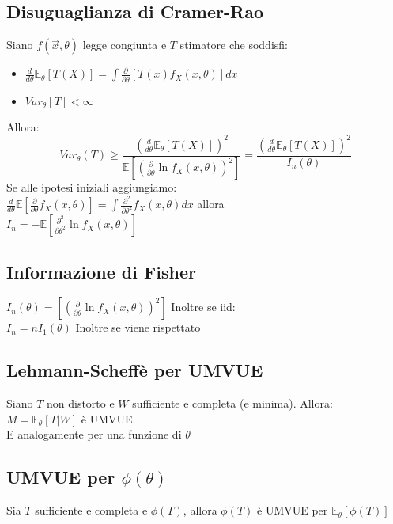 \documentclass[a4paper,notitlepage]{report}%
\newcommand{\E}{\mathbb{E}} %
\begin{document}
\begin{multicols*}{2}
    \subsection*{Disuguaglianza di Cramer-Rao}
    Siano $f(\vec{x},\theta)$ legge congiunta e $T$ stimatore che soddisfi:
    \begin{itemize}
        \item $\frac{d}{d\theta} \E_\theta[T(X)] = \int \frac{\partial}{\partial \theta}[T(x)f_X(x,\theta)]dx$
        \item $Var_\theta[T]<\infty$
    \end{itemize}
    Allora:
    \[
        Var_\theta(T) \geq 
        \frac{(\frac{d}{d\theta} \E_\theta[T(X)])^2}{\E\left[ \left( \frac{\partial}{\partial\theta}\ln f_X(x,\theta) \right)^2 \right]}
        = \frac{(\frac{d}{d\theta} \E_\theta[T(X)])^2}{I_n(\theta)}
    \]
    Se alle ipotesi iniziali aggiungiamo:\\
    $\frac{d}{d\theta}\E[\frac{\partial}{\partial\theta}f_X(x,\theta)] = \int \frac{\partial^2}{\partial\theta^2}f_X(x,\theta) dx$ allora \\
    $I_n = - \E[\frac{\partial^2}{\partial\theta^2} \ln f_X(x,\theta)]$
 

    \subsection*{Informazione di Fisher}
    $I_n(\theta) = \left[ \left( \frac{\partial}{\partial\theta} \ln f_X(x,\theta) \right)^2 \right]$
    Inoltre se iid:\\
    $I_n = n I_1(\theta)$
    Inoltre se viene rispettato


    \subsection*{Lehmann-Scheffè per UMVUE}
    Siano $T$ non distorto e $W$ sufficiente e completa (e minima).
    Allora: \\
    $M=\E_\theta[T|W]$ è UMVUE.\\
    E analogamente per una funzione di $\theta$


    \subsection*{UMVUE per $\phi(\theta)$}
    Sia $T$ sufficiente e completa e $\phi(T)$, allora
    $\phi(T)$ è UMVUE per $\E_\theta[\phi(T)]$



\end{multicols*}
\end{document}
